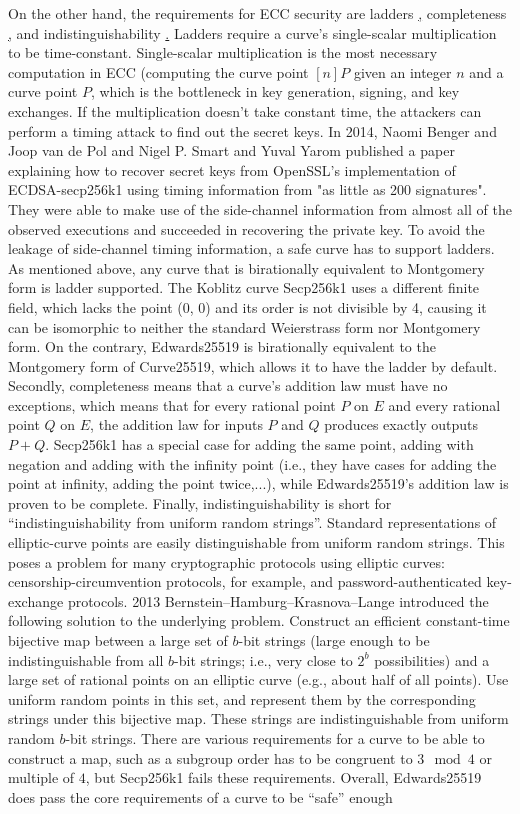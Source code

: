 On the other hand, the requirements for ECC security are ladders \href{http://safecurves.cr.yp.to/ladder.html}, completeness \href{http://safecurves.cr.yp.to/complete.html}, and indistinguishability \href{http://safecurves.cr.yp.to/ind.html}. Ladders require a curve’s single-scalar multiplication to be time-constant. Single-scalar multiplication is the most necessary computation in ECC (computing the curve point $[n]P$ given an integer $n$ and a curve point $P$, which is the bottleneck in key generation, signing, and key exchanges. If the multiplication doesn’t take constant time, the attackers can perform a timing attack to find out the secret keys. In 2014, Naomi Benger and Joop van de Pol and Nigel P. Smart and Yuval Yarom published a paper explaining how to recover secret keys from OpenSSL's implementation of ECDSA-secp256k1 using timing information from "as little as 200 signatures". They were able to make use of the side-channel information from almost all of the observed executions and succeeded in recovering the private key. To avoid the leakage of side-channel timing information, a safe curve has to support ladders.  As mentioned above, any curve that is birationally equivalent to Montgomery form is ladder supported. The Koblitz curve Secp256k1 uses a different finite field, which lacks the point (0, 0) and its order is not divisible by 4, causing it can be isomorphic to neither the standard Weierstrass form nor Montgomery form. On the contrary, Edwards25519 is birationally equivalent to the Montgomery form of Curve25519, which allows it to have the ladder by default. Secondly, completeness means that a curve’s addition law must have no exceptions, which means that for every rational point $P$ on $E$ and every rational point $Q$ on $E$, the addition law for inputs $P$ and $Q$ produces exactly outputs $P + Q$. Secp256k1 has a special case for adding the same point, adding with negation and adding with the infinity point  (i.e., they have cases for adding the point at infinity, adding the point twice,...), while Edwards25519’s addition law is proven to be complete. Finally, indistinguishability is short for “indistinguishability from uniform random strings”. Standard representations of elliptic-curve points are easily distinguishable from uniform random strings. This poses a problem for many cryptographic protocols using elliptic curves: censorship-circumvention protocols, for example, and password-authenticated key-exchange protocols. 2013 Bernstein–Hamburg–Krasnova–Lange introduced the following solution to the underlying problem. Construct an efficient constant-time bijective map between a large set of $b$-bit strings (large enough to be indistinguishable from all $b$-bit strings; i.e., very close to $2^b$ possibilities) and a large set of rational points on an elliptic curve (e.g., about half of all points). Use uniform random points in this set, and represent them by the corresponding strings under this bijective map. These strings are indistinguishable from uniform random $b$-bit strings. There are various requirements for a curve to be able to construct a map, such as a subgroup order has to be congruent to $3 \mod 4$ or multiple of $4$, but Secp256k1 fails these requirements. Overall, Edwards25519 does pass the core requirements of a curve to be “safe” enough 